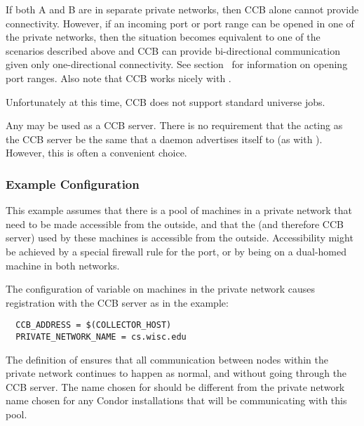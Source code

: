 If both A and B are in separate private networks, then CCB alone
cannot provide connectivity.  However, if an incoming port or port
range can be opened in one of the private networks, then the situation
becomes equivalent to one of the scenarios described above and CCB can
provide bi-directional communication given only one-directional
connectivity.  See section~\label{sec:Port-Details} for information on
opening port ranges.  Also note that CCB works nicely with
.

Unfortunately at this time, CCB does not support standard universe jobs.

Any  may be used as a CCB server.  There is no
requirement that the  acting as the CCB server
be the same  that a daemon
advertises itself to (as with ).
However, this is often a convenient choice.

\subsubsection{Example Configuration}

This example assumes that there is a pool of machines in a private
network that need to be made accessible from the outside,
and that the  (and therefore CCB server)
used by these machines is accessible from the outside.
Accessibility might be achieved by
a special firewall rule for the  port,
or by being on a dual-homed machine in both networks.

The configuration of variable  on
machines in the private network causes registration with
the CCB server as in the example:

\begin{verbatim}
  CCB_ADDRESS = $(COLLECTOR_HOST)
  PRIVATE_NETWORK_NAME = cs.wisc.edu
\end{verbatim}

The definition of  ensures that all
communication between nodes within the private network continues to happen
as normal, and without going through the CCB server.
The name chosen for  should be different
from the private network name chosen for any Condor installations that
will be communicating with this pool.

